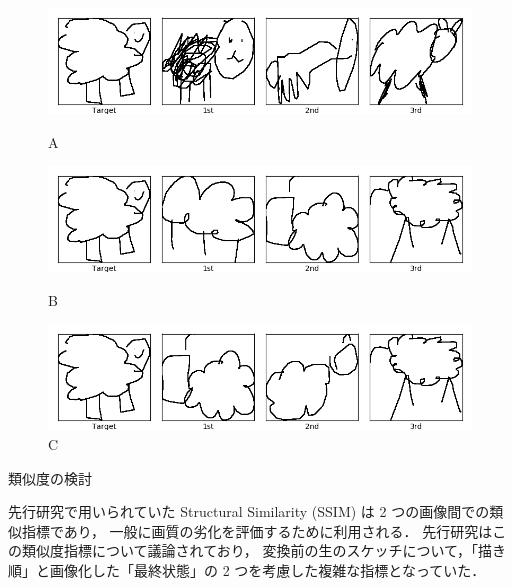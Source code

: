 \documentclass[twocolumn]{jarticle}     %
\begin{document}
\begin{figure}[tb]
 \begin{minipage}{1\hsize}
 	\begin{center}
 		\includegraphics[clip,width=120mm]{sketch_trained_sim_A_0.png}
 		\caption{A}
 		\label{fig:exp1_a}
 	\end{center}
 \end{minipage}

  \begin{minipage}{1\hsize}
  	\begin{center}
  		\includegraphics[clip,width=120mm]{sketch_trained_sim_B_0.png}
  		\caption{B}
  		\label{fig:exp1_b}
  	\end{center}
  \end{minipage}

   \begin{minipage}{1\hsize}
   	\begin{center}
   		\includegraphics[clip,width=120mm]{sketch_trained_sim_D_0.png}
   		\caption{C}
   		\label{fig:exp1_c}
   	\end{center}
   \end{minipage}
\end{figure}

類似度の検討

先行研究で用いられていた Structural Similarity (SSIM) は 2 つの画像間での類似指標であり，
一般に画質の劣化を評価するために利用される．
先行研究はこの類似度指標について議論されており，
変換前の生のスケッチについて，「描き順」と画像化した「最終状態」の 2 つを考慮した複雑な指標となっていた．
\end{document}
